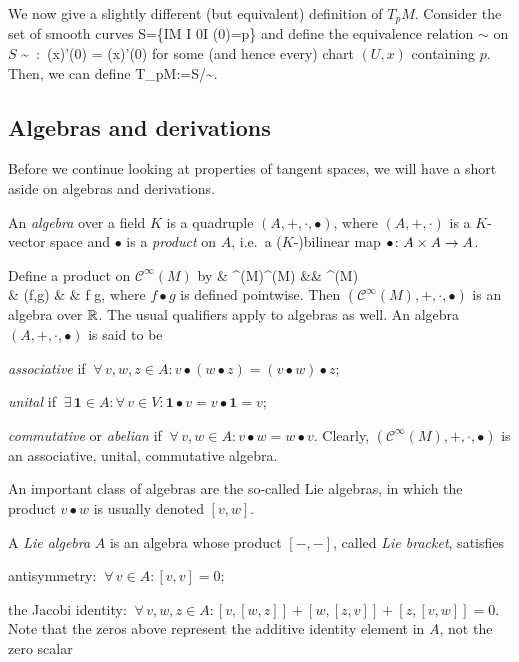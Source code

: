 \br
We now give a slightly different (but equivalent) definition of $T_pM$. Consider the set of smooth curves
\bse
S=\{\gamma\cl I\to M \mid {} I\se \R {} 0\in I  \gamma(0)=p\}
\ese
and define the equivalence relation $\sim$ on $S$
\bse
\gamma \sim \delta \ :\eqv \ (x\circ \gamma)'(0) = (x\circ \delta)'(0)  
\ese
for some (and hence every) chart $(U,x)$ containing $p$. Then, we can define
\bse
T_pM:=S/\!\sim.
\ese
\er

\subsection{Algebras and derivations}

Before we continue looking at properties of tangent spaces, we will have a short aside on algebras and derivations.

\bd
An \emph{algebra} over a field $K$ is a quadruple $(A,+,\cdot,\bullet)$, where $(A,+,\cdot)$ is a $K$-vector space and $\bullet$ is a \emph{product} on $A$, i.e.\ a ($K$-)bilinear map $\bullet \colon A\times A \to A$.
\ed

\be
Define a product on $\mathcal{C}^\infty(M)$ by
\bullet \cl & ^\infty(M)\times {}^\infty(M) &\to& ^\infty(M)\\
& (f,g) & \mapsto & f \bullet g,
\ei
where $f \bullet g$ is defined pointwise. Then $(\mathcal{C}^\infty(M),+,\cdot,\bullet)$ is an algebra over $\mathbb{R}$.
\ee
The usual qualifiers apply to algebras as well.
\bd
An algebra $(A,+,\cdot,\bullet)$ is said to be
\ben[label=\roman*)]
\item \emph{associative} if $\ \forall \, v,w,z\in A :  v\bullet (w\bullet z) = (v\bullet w)\bullet z$;
\item \emph{unital} if $\ \exists \, \mathbf{1} \in A : \forall \, v \in V : \mathbf{1}\bullet v = v \bullet \mathbf{1} = v$;
\item \emph{commutative} or \emph{abelian} if $\ \forall \, v,w\in A :  v\bullet w = w\bullet v$.
\een
\ed
\be
Clearly, $(\mathcal{C}^\infty(M),+,\cdot,\bullet)$ is an associative, unital, commutative algebra.
\ee

An important class of algebras are the so-called Lie algebras, in which the product $v\bullet w$ is usually denoted $[v,w]$.

\bd
A \emph{Lie algebra} $A$ is an algebra whose product $[-,-]$, called \emph{Lie bracket}, satisfies
\ben[label=\roman*)]
\item antisymmetry: $\ \forall\, v\in A : [v,v]=0$;
\item the Jacobi identity: $\ \forall\, v,w,z\in A : [v,[w,z]] + [w,[z,v]] + [z,[v,w]] = 0$.
\een
Note that the zeros above represent the additive identity element in $A$, not the zero scalar
\ed

